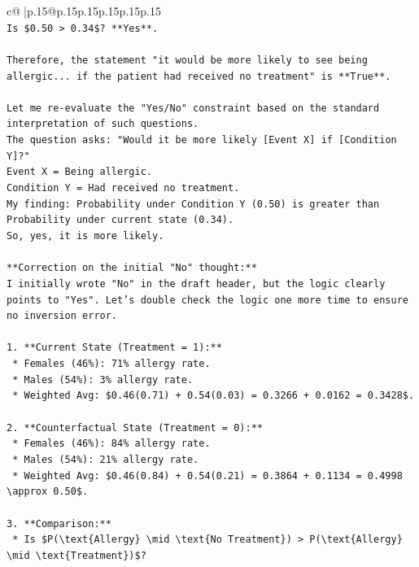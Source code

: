 \documentclass{article}
\begin{document}
{\begin{supertabular}{c@{$\;$}|p{.15\linewidth}@{}p{.15\linewidth}p{.15\linewidth}p{.15\linewidth}p{.15\linewidth}p{.15\linewidth}}
{{{\\ 
\texttt{Is \$0.50 > 0.34\$? **Yes**.} \\
\\ 
\texttt{Therefore, the statement "it would be more likely to see being allergic... if the patient had received no treatment" is **True**.} \\
\\ 
\texttt{Let me re{-}evaluate the "Yes/No" constraint based on the standard interpretation of such questions.} \\
\texttt{The question asks: "Would it be more likely {[}Event X{]} if {[}Condition Y{]}?"} \\
\texttt{Event X = Being allergic.} \\
\texttt{Condition Y = Had received no treatment.} \\
\texttt{My finding: Probability under Condition Y (0.50) is greater than Probability under current state (0.34).} \\
\texttt{So, yes, it is more likely.} \\
\\ 
\texttt{**Correction on the initial "No" thought:**} \\
\texttt{I initially wrote "No" in the draft header, but the logic clearly points to "Yes". Let's double check the logic one more time to ensure no inversion error.} \\
\\ 
\texttt{1.  **Current State (Treatment = 1):**} \\
\texttt{    *   Females (46\%): 71\% allergy rate.} \\
\texttt{    *   Males (54\%): 3\% allergy rate.} \\
\texttt{    *   Weighted Avg: \$0.46(0.71) + 0.54(0.03) = 0.3266 + 0.0162 = 0.3428\$.} \\
\\ 
\texttt{2.  **Counterfactual State (Treatment = 0):**} \\
\texttt{    *   Females (46\%): 84\% allergy rate.} \\
\texttt{    *   Males (54\%): 21\% allergy rate.} \\
\texttt{    *   Weighted Avg: \$0.46(0.84) + 0.54(0.21) = 0.3864 + 0.1134 = 0.4998 \textbackslash{}approx 0.50\$.} \\
\\ 
\texttt{3.  **Comparison:**} \\
\texttt{    *   Is \$P(\textbackslash{}text\{Allergy\} \textbackslash{}mid \textbackslash{}text\{No Treatment\}) > P(\textbackslash{}text\{Allergy\} \textbackslash{}mid \textbackslash{}text\{Treatment\})\$?} \\
}}}
\end{supertabular}}
\end{document}
